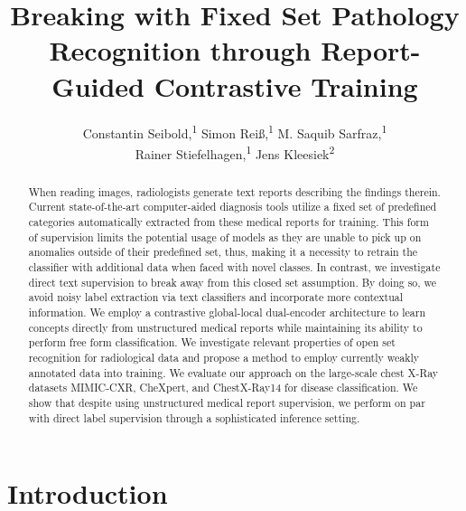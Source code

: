 \documentclass[runningheads]{llncs}
\begin{document}



\title{Breaking with Fixed Set Pathology Recognition through Report-Guided Contrastive Training}
\author{Constantin Seibold,\textsuperscript{\rm1} 
        Simon Rei\ss,\textsuperscript{\rm1}
        M. Saquib Sarfraz,\textsuperscript{\rm1}\\
        Rainer Stiefelhagen,\textsuperscript{\rm1}
        Jens Kleesiek\textsuperscript{\rm2}}
\maketitle              \begin{abstract}
When reading images, radiologists generate text reports describing the findings therein. Current state-of-the-art computer-aided diagnosis tools utilize a fixed set of predefined categories automatically extracted from these medical reports for training. This form of supervision limits the potential usage of models as they are unable to pick up on anomalies outside of their predefined set, thus, making it a necessity to retrain the classifier with additional data when faced with novel classes. In contrast, we investigate direct text supervision to break away from this closed set assumption. By doing so, we avoid noisy label extraction via text classifiers and incorporate more contextual information.
    We employ a contrastive global-local dual-encoder architecture to learn concepts directly from unstructured medical reports while maintaining its ability to perform free form classification. 
    We investigate relevant properties of open set recognition for radiological data and propose a method to employ currently weakly annotated data into training.
    We evaluate our approach on the large-scale chest X-Ray datasets MIMIC-CXR, CheXpert, and ChestX-Ray14 for disease classification. We show that despite using unstructured medical report supervision, we perform on par with direct label supervision through a sophisticated inference setting. 
\end{abstract} %
 \section{Introduction}
\setlength{\abovecaptionskip}{2pt}
\setlength{\belowcaptionskip}{-12pt}
\end{document}
